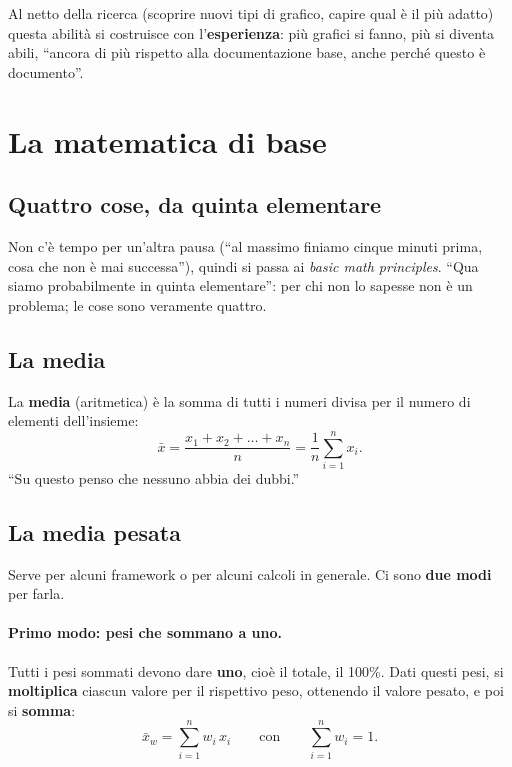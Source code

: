 Al netto della ricerca (scoprire nuovi tipi di grafico, capire qual è il più
adatto) questa abilità si costruisce con l'\textbf{esperienza}: più grafici si
fanno, più si diventa abili, ``ancora di più rispetto alla documentazione
base, anche perché questo è documento''.

\section{La matematica di base}
\label{sec:matematica-base}

\subsection{Quattro cose, da quinta elementare}

Non c'è tempo per un'altra pausa (``al massimo finiamo cinque minuti prima,
cosa che non è mai successa''), quindi si passa ai \emph{basic math
principles}. ``Qua siamo probabilmente in quinta elementare'': per chi non lo
sapesse non è un problema; le cose sono veramente quattro.

\subsection{La media}

La \textbf{media} (aritmetica) è la somma di tutti i numeri divisa per il
numero di elementi dell'insieme:
\[
  \bar{x} = \frac{x_1 + x_2 + \dots + x_n}{n} = \frac{1}{n}\sum_{i=1}^{n} x_i .
\]
``Su questo penso che nessuno abbia dei dubbi.''

\subsection{La media pesata}

Serve per alcuni framework o per alcuni calcoli in generale. Ci sono
\textbf{due modi} per farla.

\paragraph{Primo modo: pesi che sommano a uno.} Tutti i pesi sommati devono
dare \textbf{uno}, cioè il totale, il 100\%. Dati questi pesi, si
\textbf{moltiplica} ciascun valore per il rispettivo peso, ottenendo il valore
pesato, e poi si \textbf{somma}:
\[
  \bar{x}_w = \sum_{i=1}^{n} w_i\, x_i \qquad \text{con} \qquad
  \sum_{i=1}^{n} w_i = 1 .
\]

